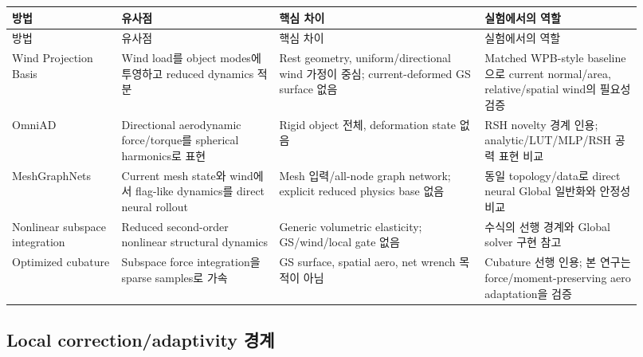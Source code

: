 \documentclass[11pt,a4paper]{article}
\begin{document}
\begin{longtable}{L{0.16\linewidth}L{0.23\linewidth}L{0.30\linewidth}L{0.23\linewidth}}
\toprule
방법 & 유사점 & 핵심 차이 & 실험에서의 역할 \\
\midrule
\endfirsthead
\toprule
방법 & 유사점 & 핵심 차이 & 실험에서의 역할 \\
\midrule
\endhead
Wind Projection Basis \cite{diener2009windbasis}
& Wind load를 object modes에 투영하고 reduced dynamics 적분
& Rest geometry, uniform/directional wind 가정이 중심; current-deformed GS surface 없음
& Matched WPB-style baseline으로 current normal/area, relative/spatial wind의 필요성 검증 \\
\addlinespace
OmniAD \cite{martin2015omniad}
& Directional aerodynamic force/torque를 spherical harmonics로 표현
& Rigid object 전체, deformation state 없음
& RSH novelty 경계 인용; analytic/LUT/MLP/RSH 공력 표현 비교 \\
\addlinespace
MeshGraph\-Nets \cite{pfaff2021meshgraphnets}
& Current mesh state와 wind에서 flag-like dynamics를 direct neural rollout
& Mesh 입력/all-node graph network; explicit reduced physics base 없음
& 동일 topology/data로 direct neural Global 일반화와 안정성 비교 \\
\addlinespace
Nonlinear subspace integration \cite{barbic2005stvk}
& Reduced second-order nonlinear structural dynamics
& Generic volumetric elasticity; GS/wind/local gate 없음
& 수식의 선행 경계와 Global solver 구현 참고 \\
\addlinespace
Optimized cubature \cite{an2008cubature}
& Subspace force integration을 sparse samples로 가속
& GS surface, spatial aero, net wrench 목적이 아님
& Cubature 선행 인용; 본 연구는 force/moment-preserving aero adaptation을 검증 \\
\bottomrule
\end{longtable}

\subsection{Local correction/adaptivity 경계}
\end{document}
